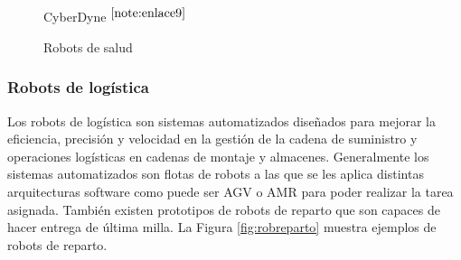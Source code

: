 \begin{figure}[ht!]
\begin{minipage}{0.25\linewidth}
    	\caption*{\centering CyberDyne $^{\ref{note:enlace9}}$}
    \end{minipage}
	\caption{Robots de salud}
	\label{fig:robsalud}
\end{figure}


\setcounter{footnote}{6} %

\setcounter{footnote}{7} %

\setcounter{footnote}{8} %

\setcounter{footnote}{9} %

\subsubsection{Robots de logística}

Los robots de logística son sistemas automatizados diseñados para mejorar la eficiencia, precisión y velocidad en la gestión de la cadena de suministro y operaciones logísticas en cadenas de montaje y almacenes. Generalmente los sistemas automatizados son flotas de robots a las que se les aplica distintas arquitecturas software como puede ser \acs{AGV} o \acs{AMR} para poder realizar la tarea asignada. También existen prototipos de robots de reparto que son capaces de hacer entrega de última milla. La Figura \ref{fig:robreparto}  muestra ejemplos de robots de reparto. \\ 

